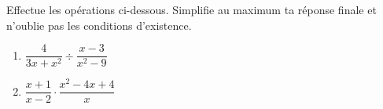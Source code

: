 %
%
    Effectue les opérations ci-dessous. Simplifie au maximum ta réponse finale et n'oublie pas les conditions d'existence.
    \begin{enumerate}[cols=2]
        \item %
              $\dfrac{4}{3x+x^2} \div \dfrac{x-3}{x^2-9}$
        \item %
              $\dfrac{x+1}{x-2}\cdot\dfrac{x^2-4x+4}{x}$
    \end{enumerate}
